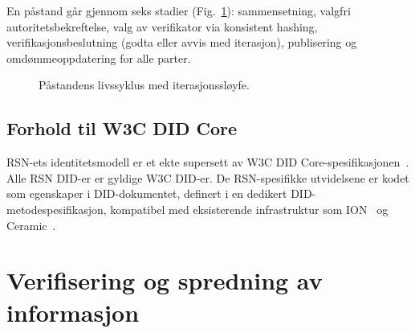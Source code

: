 \documentclass[11pt,a4paper,twocolumn]{article}
\begin{document}
En påstand går gjennom seks stadier (Fig.~\ref{fig:lifecycle}): sammensetning, valgfri autoritetsbekreftelse, valg av verifikator via konsistent hashing, verifikasjonsbeslutning (godta eller avvis med iterasjon), publisering og omdømmeoppdatering for alle parter.

\begin{figure}[ht]
\centering
{}
\caption{Påstandens livssyklus med iterasjonssløyfe.}
\label{fig:lifecycle}
\end{figure}

\subsection{Forhold til W3C DID Core}

RSN-ets identitetsmodell er et ekte supersett av W3C DID Core-spesifikasjonen~\cite{did2022}. Alle RSN DID-er er gyldige W3C DID-er. De RSN-spesifikke utvidelsene er kodet som egenskaper i DID-dokumentet, definert i en dedikert DID-metodespesifikasjon, kompatibel med eksisterende infrastruktur som ION~\cite{buchner2021} og Ceramic~\cite{ceramic2023}.

\section{Verifisering og spredning av informasjon}
\end{document}
